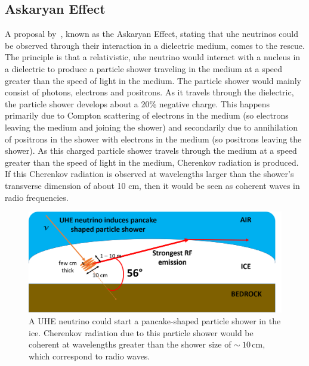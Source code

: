\subsection{Askaryan Effect}

A proposal by~\cite{askaryan}, known as the Askaryan Effect, stating that \gls{uhe} neutrinos could be observed through their interaction in a dielectric medium, comes to the rescue. The principle is that a relativistic, \gls{uhe} neutrino would interact with a nucleus in a dielectric to produce a particle shower traveling in the medium at a speed greater than the speed of light in the medium. The particle shower would mainly consist of photons, electrons and positrons. As it travels through the dielectric, the particle shower develops about a 20\% negative charge. This happens primarily due to Compton scattering of electrons in the medium (so electrons leaving the medium and joining the shower) and secondarily due to annihilation of positrons in the shower with electrons in the medium (so positrons leaving the shower).   
As this charged particle shower travels through the medium at a speed greater than the speed of light in the medium, Cherenkov radiation is produced. If this Cherenkov radiation is observed at wavelengths larger than the shower's transverse dimension of about 10 cm, then it would be seen as coherent waves in radio frequencies. 

\begin{figure}
\centering
\includegraphics[width=1.0\textwidth]{figures/askaryan_in_ice.png}
\caption{A UHE neutrino could start a pancake-shaped particle shower in the ice.
Cherenkov radiation due to this particle shower would be coherent at wavelengths 
greater than the shower size of $\sim~10\,\mbox{cm}$, which correspond to radio waves.}
\label{askaryan}
\end{figure}


